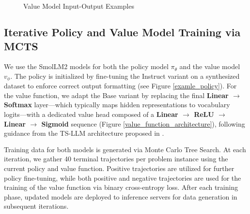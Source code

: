 \documentclass{article}
\begin{document}
\begin{figure}[H]
\begin{minipage}{0.48\textwidth}
        \caption{Value Model Input-Output Examples}
        \label{examle_value_function}
    \end{minipage}
\end{figure}

\subsection{Iterative Policy and Value Model Training via MCTS}

We use the SmolLM2 models \cite{allal2025smollm2} for both the policy model $\pi_\theta$ and the value model $v_\phi$. The policy is initialized by fine-tuning the Instruct variant on a synthesized dataset to enforce correct output formatting (see Figure \ref{examle_policy}). For the value function, we adapt the Base variant by replacing the final \textbf{Linear $\to$ Softmax} layer—which typically maps hidden representations to vocabulary logits—with a dedicated value head composed of a \textbf{Linear $\to$ ReLU $\to$ Linear $\to$ Sigmoid} sequence (Figure \ref{value_function_architecture}), following guidance from the TS-LLM architecture proposed in \cite{feng2023alphazero}.

Training data for both models is generated via Monte Carlo Tree Search. At each iteration, we gather 40 terminal trajectories per problem instance using the current policy and value function. Positive trajectories are utilized for further policy fine-tuning, while both positive and negative trajectories are used for the training of the value function via binary cross-entropy loss. After each training phase, updated models are deployed to inference servers for data generation in subsequent iterations.
\end{document}
